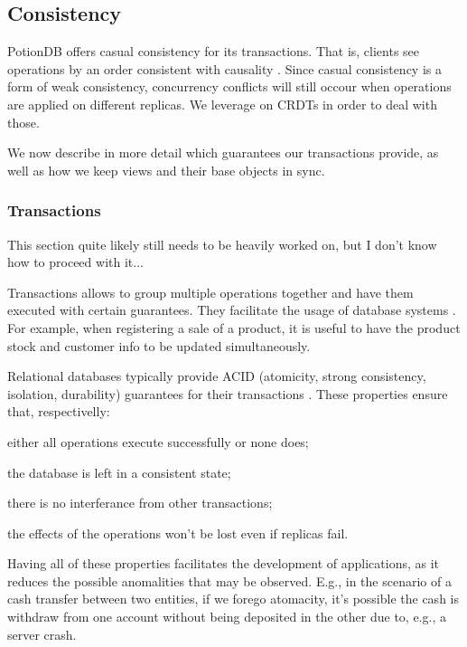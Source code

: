 \documentclass{vldb}
\newcommand{\grumbler}[2]{{\color{red}{\bf #1:} #2}}
\newcommand{\andre}[1]{\grumbler{andre}{#1}}
\begin{document}
\subsection{Consistency}


PotionDB offers casual consistency for its transactions.
That is, clients see operations by an order consistent with causality \cite{???}.
Since casual consistency is a form of weak consistency, concurrency conflicts will still occour when operations are applied on different replicas.
We leverage on CRDTs in order to deal with those.

We now describe in more detail which guarantees our transactions provide, as well as how we keep views and their base objects in sync.

\subsubsection{Transactions}

\andre{This section quite likely still needs to be heavily worked on, but I don't know how to proceed with it...}

Transactions allows to group multiple operations together and have them executed with certain guarantees.
They facilitate the usage of database systems \cite{???}.
For example, when registering a sale of a product, it is useful to have the product stock and customer info to be updated simultaneously. %

Relational databases typically provide ACID (atomicity, strong consistency, isolation, durability) guarantees for their transactions \cite{???}.
These properties ensure that, respectivelly:
\begin{enumerate*}[label=(\roman*)]
	\item either all operations execute successfully or none does;
	\item the database is left in a consistent state;
	\item there is no interferance from other transactions;
	\item the effects of the operations won't be lost even if replicas fail.
\end{enumerate*}
Having all of these properties facilitates the development of applications, as it reduces the possible anomalities that may be observed.
E.g., in the scenario of a cash transfer between two entities, if we forego atomacity, it's possible the cash is withdraw from one account without being deposited in the other due to, e.g., a server crash.
\end{document}
